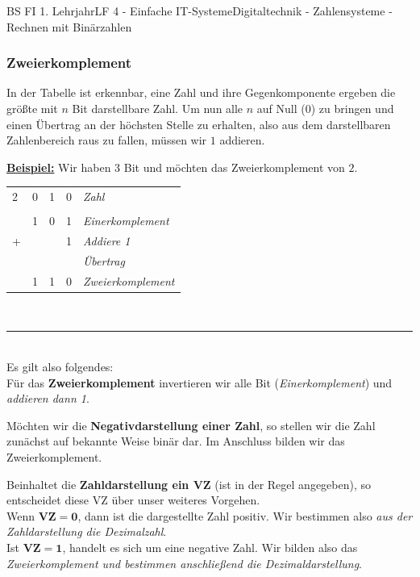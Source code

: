 \documentclass[11pt,twocolumn,oneside,openany,headings=optiontotoc,11pt,numbers=noenddot]{article}
\begin{document}
\begin{worksheet}{BS FI 1. Lehrjahr}{LF 4 - Einfache IT-Systeme}{Digitaltechnik - Zahlensysteme - Rechnen mit Binärzahlen}
		\subsubsection{Zweierkomplement}
		In der Tabelle ist erkennbar, eine Zahl und ihre Gegenkomponente ergeben die größte mit \(n\) Bit darstellbare Zahl. Um nun alle \(n\) auf Null (0) zu bringen und einen Übertrag an der höchsten Stelle zu erhalten, also aus dem darstellbaren Zahlenbereich raus zu fallen, müssen wir \(1\) addieren.\\\par\noindent
		\textbf{\underline{Beispiel:}} Wir haben 3 Bit und möchten das Zweierkomplement von \(2\).\\
		\par\noindent
		\begin{tabularx}{0.48\textwidth}{l|cccl}
			2 & 0 & 1 & 0 & \textit{\small{Zahl}}\\
			\cline{1-5}
			\\
			& 1 & 0 & 1 & \textit{\small{Einerkomplement}}\normalsize\\
			+ & & & 1 & \textit{\small{Addiere 1}}\normalsize\\
			& & \color{codegray}{\tiny{1}} & & \textit{\tiny{Übertrag}}\\
			\cline{1-5}\normalcolor\normalsize
			& 1 & 1 & 0 & \textit{\small{Zweierkomplement}}\normalsize
		\end{tabularx}\\
		\par\noindent
		\rule{0.48\textwidth}{0.1pt}\\
		Es gilt also folgendes:\\
		Für das \textbf{Zweierkomplement} invertieren wir alle Bit (\textit{Einerkomplement}) und \textit{addieren dann 1}.\\
		\par\noindent
		Möchten wir die \textbf{Negativdarstellung einer Zahl}, so stellen wir die Zahl zunächst auf bekannte Weise binär dar. Im Anschluss bilden wir das Zweierkomplement.\\
		\par\noindent
		Beinhaltet die \textbf{Zahldarstellung ein VZ} (ist in der Regel angegeben), so entscheidet diese VZ über unser weiteres Vorgehen.\\
		Wenn \(\mathbf{VZ = 0}\), dann ist die dargestellte Zahl positiv. Wir bestimmen also \textit{aus der Zahldarstellung die Dezimalzahl}.\\
		Ist \(\mathbf{VZ = 1}\), handelt es sich um eine negative Zahl. Wir bilden also das \textit{Zweierkomplement und bestimmen anschließend die Dezimaldarstellung}.\\

\end{worksheet}
\end{document}
